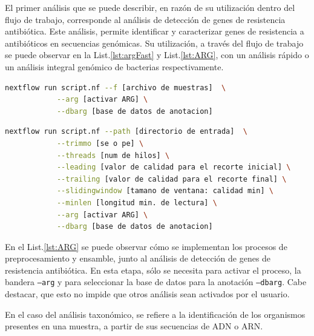 \documentclass[12pt]{article}
\begin{document}
El primer análisis que se puede describir, en razón de su 
utilización dentro del flujo de trabajo, corresponde al 
análisis de detección de genes de resistencia antibiótica. 
Este análisis, permite identificar y caracterizar genes de 
resistencia a antibióticos en secuencias genómicas. Su 
utilización, a través del flujo de trabajo se puede observar 
en la List.\ref{lst:argFast} y  List.\ref{lst:ARG}, 
con un análisis rápido o un análisis 
integral genómico de bacterias respectivamente. 

\newpage

\begin{center}
    \begin{lstlisting}[language=bash, caption=Comando para ejecutar un análisis rápido de identificación de genes de resistencia antibiótica \emph{(elaboración propia)}., label=lst:argFast]
        nextflow run script.nf --f [archivo de muestras]  \
            --arg [activar ARG] \
            --dbarg [base de datos de anotacion]
    \end{lstlisting}
\end{center}


\begin{center}
    \begin{lstlisting}[language=bash, caption=Comando para la ejecución de un análisis de ARG \emph{(elaboración propia)}., label=lst:ARG]
        nextflow run script.nf --path [directorio de entrada]  \
            --trimmo [se o pe] \
            --threads [num de hilos] \
            --leading [valor de calidad para el recorte inicial] \
            --trailing [valor de calidad para el recorte final] \
            --slidingwindow [tamano de ventana: calidad min] \
            --minlen [longitud min. de lectura] \
            --arg [activar ARG] \
            --dbarg [base de datos de anotacion]
    \end{lstlisting}
\end{center}

En el List.\ref{lst:ARG} se puede observar cómo se implementan los 
procesos de preprocesamiento y ensamble, junto al análisis 
de detección de genes de resistencia antibiótica. En esta 
etapa, sólo se necesita para activar el proceso, la bandera 
\texttt{--arg} y para seleccionar la base de datos para la anotación 
\texttt{--dbarg}. Cabe destacar, que esto no impide que otros análisis 
sean activados por el usuario.

En el caso del análisis taxonómico, se refiere a la 
identificación de los organismos presentes en una muestra, 
a partir de sus secuencias de ADN o ARN. 
\end{document}
